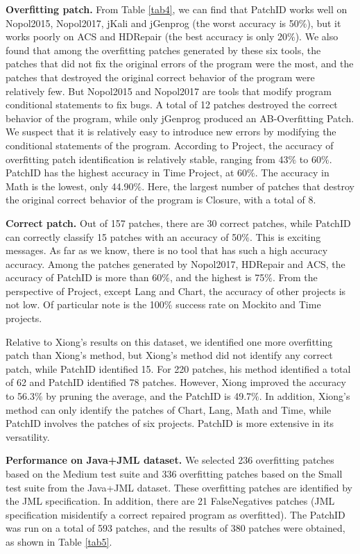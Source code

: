 \documentclass[sn-basic]{sn-jnl}
\theoremstyle{thmstyleone}
\theoremstyle{thmstyletwo}
\theoremstyle{thmstylethree}
\begin{document}
\textbf{Overfitting patch.} From Table \ref{tab4}, we can find that PatchID works well on Nopol2015, Nopol2017, jKali and jGenprog (the worst accuracy  is 50$\%$), but it works poorly on ACS and HDRepair (the best accuracy is only 20$\%$). We also found that among the overfitting patches generated by these six tools, the patches that did not fix the original errors of the program were the most, and the patches that destroyed the original correct behavior of the program were relatively few. But Nopol2015 and Nopol2017 are tools that modify program conditional statements to fix bugs. A total of 12 patches destroyed the correct behavior of the program, while only jGenprog produced an AB-Overfitting Patch. We suspect that it is relatively easy to introduce new errors by modifying the conditional statements of the program.
According to Project, the accuracy of overfitting patch identification is relatively stable, ranging from 43$\%$ to 60$\%$. PatchID has the highest accuracy in Time Project, at 60$\%$. The accuracy in Math is the lowest, only 44.90$\%$. Here, the largest number of patches that destroy the original correct behavior of the program is Closure, with a total of 8.

\textbf{Correct patch.} Out of 157 patches, there are 30 correct patches, while PatchID can correctly classify 15 patches with an accuracy of 50$\%$. This is exciting messages. As far as we know, there is no tool that has such a high accuracy accuracy. Among the patches generated by Nopol2017, HDRepair and ACS, the accuracy of PatchID is more than 60$\%$, and the highest is 75$\%$. From the perspective of Project, except Lang and Chart, the accuracy of other projects is not low. Of particular note is the 100$\%$ success rate on Mockito and Time projects.

Relative to Xiong's results on this dataset, we identified one more overfitting patch than Xiong's method, but Xiong's method did not identify any correct patch, while PatchID identified 15. For 220 patches, his method identified a total of 62 and PatchID identified 78 patches. However, Xiong improved the accuracy to 56.3$\%$ by pruning the average, and the PatchID is 49.7$\%$. In addition, Xiong's method can only identify the patches of Chart, Lang, Math and Time, while PatchID involves the patches of six projects. PatchID is more extensive in its versatility.

\textbf{Performance on Java+JML dataset.} We selected 236 overfitting patches based on the Medium test suite and 336 overfitting patches based on the Small test suite from the Java+JML dataset. These overfitting patches are identified by the JML specification. In addition, there are 21 FalseNegatives patches (JML specification misidentify a correct repaired program as overfitted). The PatchID was run on a total of 593 patches, and the results of 380 patches were obtained, as shown in Table \ref{tab5}.
\end{document}
